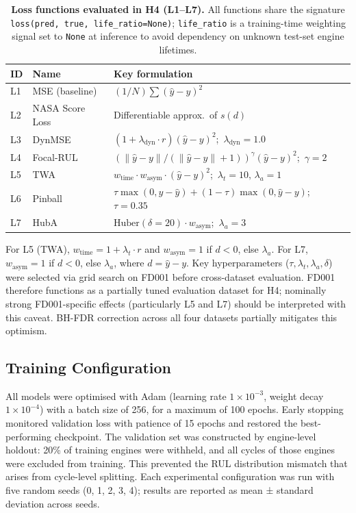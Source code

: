 \documentclass[review,12pt]{elsarticle}
\begin{document}
\begin{table}[!t]
\centering
\small
\caption*{\textbf{Loss functions evaluated in H4 (L1--L7).} All functions share the signature \texttt{loss(pred, true, life\_ratio=None)}; \texttt{life\_ratio} is a training-time weighting signal set to \texttt{None} at inference to avoid dependency on unknown test-set engine lifetimes.}
\label{tab:4}
\begin{tabular}{lll}
\toprule
\textbf{ID} & \textbf{Name} & \textbf{Key formulation} \\
\midrule
L1 & MSE (baseline) & $(1/N)\sum (\hat{y}-y)^2$ \\
L2 & NASA Score Loss & Differentiable approx.\ of $s(d)$ \\
L3 & DynMSE & $(1+\lambda_{\text{dyn}}{\cdot}r)(\hat{y}-y)^2$;\ $\lambda_{\text{dyn}}=1.0$ \\
L4 & Focal-RUL & $({\|\hat{y}-y\|}/{(\|\hat{y}-y\|+1)})^{\gamma}(\hat{y}-y)^2$;\ $\gamma=2$ \\
L5 & TWA & $w_{\text{time}}{\cdot}w_{\text{asym}}{\cdot}(\hat{y}-y)^2$;\ $\lambda_t=10,\,\lambda_a=1$ \\
L6 & Pinball & $\tau\max(0,y{-}\hat{y})+(1{-}\tau)\max(0,\hat{y}{-}y)$;\ $\tau=0.35$ \\
L7 & HubA & $\text{Huber}(\delta{=}20){\cdot}w_{\text{asym}}$;\ $\lambda_a=3$ \\
\bottomrule
\end{tabular}
\end{table}


For L5 (TWA), $w_{\text{time}} = 1 + \lambda_t \cdot r$ and $w_{\text{asym}} = 1$ if $d < 0$, else $\lambda_a$. For L7, $w_{\text{asym}} = 1$ if $d < 0$, else $\lambda_a$, where $d = \hat{y} - y$. Key hyperparameters ($\tau, \lambda_t, \lambda_a, \delta$) were selected via grid search on FD001 before cross-dataset evaluation. FD001 therefore functions as a partially tuned evaluation dataset for H4; nominally strong FD001-specific effects (particularly L5 and L7) should be interpreted with this caveat. BH-FDR correction across all four datasets partially mitigates this optimism.

\subsection{Training Configuration}

All models were optimised with Adam (learning rate $1\times10^{-3}$, weight decay $1\times10^{-4}$) with a batch size of 256, for a maximum of 100 epochs. Early stopping monitored validation loss with patience of 15 epochs and restored the best-performing checkpoint. The validation set was constructed by engine-level holdout: 20\% of training engines were withheld, and all cycles of those engines were excluded from training. This prevented the RUL distribution mismatch that arises from cycle-level splitting. Each experimental configuration was run with five random seeds (0, 1, 2, 3, 4); results are reported as mean ± standard deviation across seeds.
\end{document}
